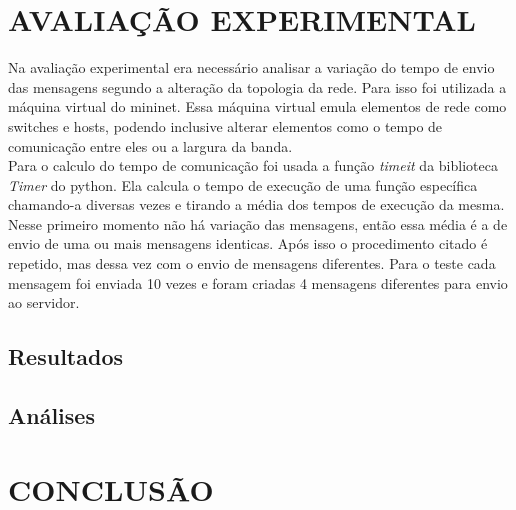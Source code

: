 \documentclass[12pt]{article}
\begin{document}
\section{AVALIAÇÃO EXPERIMENTAL}
\label{avaliacao_experimental}
Na avaliação experimental era necessário analisar a variação do tempo de envio das mensagens segundo a alteração da topologia da rede.
Para isso foi utilizada a máquina virtual do mininet. Essa máquina virtual emula elementos de rede como switches e hosts,
podendo inclusive alterar elementos como o tempo de comunicação entre eles ou a largura da banda.\\

Para o calculo do tempo de comunicação foi usada a função \textit{timeit} da biblioteca \textit{Timer} do python.
Ela calcula o tempo de execução de uma função específica chamando-a diversas vezes e tirando a média dos tempos de execução da mesma.
Nesse primeiro momento não há variação das mensagens, então essa média é a de envio de uma ou mais mensagens identicas.
Após isso o procedimento citado é repetido, mas dessa vez com o envio de mensagens diferentes.
Para o teste cada mensagem foi enviada 10 vezes e foram criadas 4 mensagens diferentes para envio ao servidor.

\subsection{Resultados}

\subsection{Análises}

\section{CONCLUSÃO}
\label{conclusao}
\end{document}
